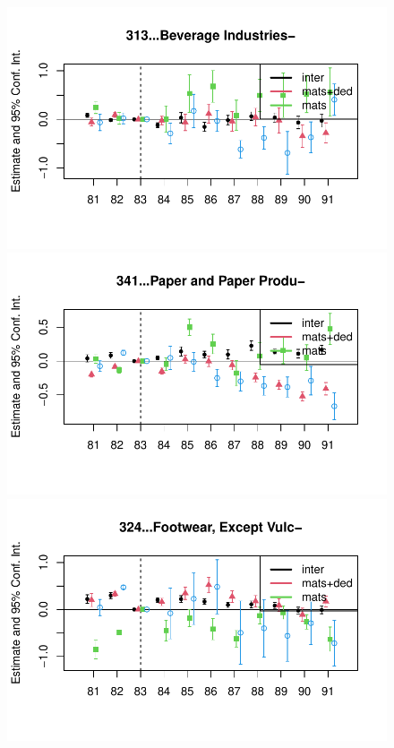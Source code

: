 \documentclass[
  12pt]{article}
\theoremstyle{definition}
\theoremstyle{remark}
\begin{document}
\begin{figure}
\begin{minipage}{\linewidth}
\includegraphics{Tax-Prod_files/figure-pdf/unnamed-chunk-12-7.pdf}

\includegraphics{Tax-Prod_files/figure-pdf/unnamed-chunk-12-8.pdf}

\includegraphics{Tax-Prod_files/figure-pdf/unnamed-chunk-12-9.pdf}


\end{minipage}
\end{figure}
\end{document}
